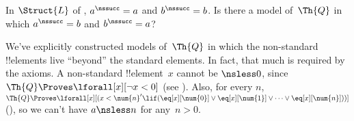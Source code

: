 \documentclass[../../../include/open-logic-section]{subfiles}
\begin{document}
\begin{prob}
In $\Struct{L}$ of , $a^\nssucc
= a$ and $b^\nssucc = b$. Is there a model of~$\Th{Q}$ in which
$a^\nssucc = b$ and $b^\nssucc = a$?
\end{prob}

\begin{explain}
We've explicitly constructed models of~$\Th{Q}$ in which the
non-standard !!{element}s live ``beyond'' the standard elements. In
fact, that much is required by the axioms. A non-standard
!!{element}~$x$ cannot be ${} \nsless 0$, since $\Th{Q} \Proves
\lforall[x][\lnot x<0]$ (see ).
Also, for every $n$, $\Th{Q} \Proves \lforall[x][(x < \num{n}' \lif
(\eq[x][\num{0}] \lor \eq[x][\num{1}] \lor \dots \lor
\eq[x][\num{n}]))]$ (), so we
can't have $a \nsless n$ for any~$n>0$.
\end{explain}
\end{document}
